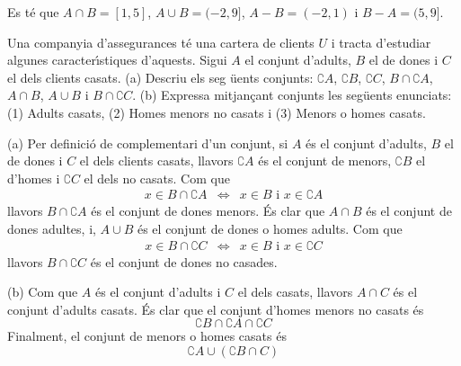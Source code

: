 \begin{solucio}
Es t\'{e} que $A\cap B=[1,5]$, $A\cup B=(-2,9]$, $A-B=(-2,1)$ i $B-A=(5,9]$.
\end{solucio}

\begin{exercici}
Una companyia d'assegurances t\'{e} una cartera de clients $U$ i tracta
d'estudiar algunes caracter\'{\i}stiques d'aquests. Sigui $A$ el conjunt
d'adults, $B$ el de dones i $C$ el dels clients casats. (a) Descriu els seg%
\"{u}ents conjunts: $\complement A$, $\complement B$, $\complement C$, $%
B\cap \complement A$, $A\cap B$, $A\cup B$ i $B\cap \complement C$. (b)
Expressa mitjan\c{c}ant conjunts les seg\"{u}ents enunciats: (1) Adults
casats, (2) Homes menors no casats i (3) Menors o homes casats.
\end{exercici}

\begin{solucio}
(a) Per definici\'{o} de complementari d'un conjunt, si $A$ \'{e}s el
conjunt d'adults, $B$ el de dones i $C$ el dels clients casats, llavors $%
\complement A$ \'{e}s el conjunt de menors, $\complement B$ el d'homes i $%
\complement C$ el dels no casats. Com que%
\begin{equation*}
\begin{array}{ccc}
x\in B\cap \complement A & \Longleftrightarrow & x\in B\text{ i }x\in
\complement A%
\end{array}%
\end{equation*}%
llavors $B\cap \complement A$ \'{e}s el conjunt de dones menors. \'{E}s clar
que $A\cap B$ \'{e}s el conjunt de dones adultes, i, $A\cup B$ \'{e}s el
conjunt de dones o homes adults. Com que%
\begin{equation*}
\begin{array}{ccc}
x\in B\cap \complement C & \Longleftrightarrow & x\in B\text{ i }x\in
\complement C%
\end{array}%
\end{equation*}%
llavors $B\cap \complement C$ \'{e}s el conjunt de dones no casades.

(b) Com que $A$ \'{e}s el conjunt d'adults i $C$ el dels casats, llavors $%
A\cap C$ \'{e}s el conjunt d'adults casats. \'{E}s clar que el conjunt
d'homes menors no casats \'{e}s%
\begin{equation*}
\complement B\cap \complement A\cap \complement C
\end{equation*}%
Finalment, el conjunt de menors o homes casats \'{e}s%
\begin{equation*}
\complement A\cup (\complement B\cap C)
\end{equation*}
\end{solucio}

